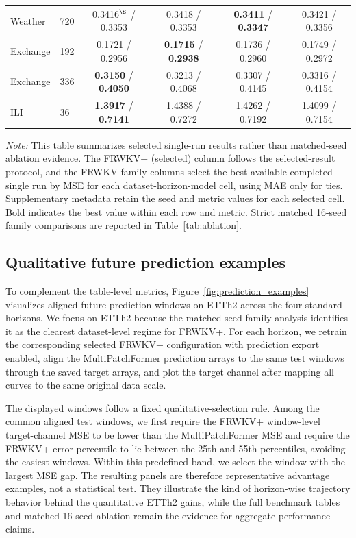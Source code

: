 \documentclass[a4paper,fleqn]{cas-sc}
\begin{document}
\begin{table}[t]
\begin{tabular}{llcccc}
Weather & 720 & 0.3416$^\S$ / 0.3353 & 0.3418 / 0.3353 & \textbf{0.3411} / \textbf{0.3347} & 0.3421 / 0.3356 \\
Exchange & 192 & 0.1721 / 0.2956 & \textbf{0.1715} / \textbf{0.2938} & 0.1736 / 0.2960 & 0.1749 / 0.2972 \\
Exchange & 336 & \textbf{0.3150} / \textbf{0.4050} & 0.3213 / 0.4068 & 0.3307 / 0.4145 & 0.3316 / 0.4154 \\
ILI & 36 & \textbf{1.3917} / \textbf{0.7141} & 1.4388 / 0.7272 & 1.4262 / 0.7192 & 1.4099 / 0.7154 \\
\bottomrule
\end{tabular}
\par\smallskip
\begin{minipage}{\textwidth}
\footnotesize \emph{Note:} This table summarizes selected single-run results rather than matched-seed ablation evidence. The FRWKV+ (selected) column follows the selected-result protocol, and the FRWKV-family columns select the best available completed single run by MSE for each dataset-horizon-model cell, using MAE only for ties. Supplementary metadata retain the seed and metric values for each selected cell. Bold indicates the best value within each row and metric. Strict matched 16-seed family comparisons are reported in Table~\ref{tab:ablation}.
\end{minipage}
\end{table}

\subsection{Qualitative future prediction examples}
To complement the table-level metrics, Figure~\ref{fig:prediction_examples} visualizes aligned future prediction windows on ETTh2 across the four standard horizons. We focus on ETTh2 because the matched-seed family analysis identifies it as the clearest dataset-level regime for FRWKV+. For each horizon, we retrain the corresponding selected FRWKV+ configuration with prediction export enabled, align the MultiPatchFormer prediction arrays to the same test windows through the saved target arrays, and plot the target channel after mapping all curves to the same original data scale.

The displayed windows follow a fixed qualitative-selection rule. Among the common aligned test windows, we first require the FRWKV+ window-level target-channel MSE to be lower than the MultiPatchFormer MSE and require the FRWKV+ error percentile to lie between the 25th and 55th percentiles, avoiding the easiest windows. Within this predefined band, we select the window with the largest MSE gap. The resulting panels are therefore representative advantage examples, not a statistical test. They illustrate the kind of horizon-wise trajectory behavior behind the quantitative ETTh2 gains, while the full benchmark tables and matched 16-seed ablation remain the evidence for aggregate performance claims.
\end{document}
